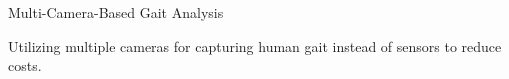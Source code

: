 
\vspace{-2mm}

\begin{cventries}

  \cventry
    {} %
    {Multi-Camera-Based Gait Analysis} %
    {} %
    {} %
    {
      \vspace{-1mm}
      \begin{cvitems} %
        \item {
        Utilizing multiple cameras for capturing human gait instead of sensors to reduce costs.
        }
      \end{cvitems}
    }
  \vspace{-2mm}

\end{cventries}